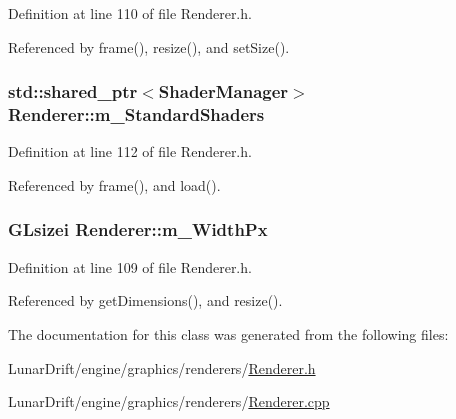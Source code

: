 Definition at line 110 of file Renderer.\+h.



Referenced by frame(), resize(), and set\+Size().

\subsubsection[{\texorpdfstring{m\+\_\+\+Standard\+Shaders}{m_StandardShaders}}]{\setlength{\rightskip}{0pt plus 5cm}std\+::shared\+\_\+ptr$<${\bf Shader\+Manager}$>$ Renderer\+::m\+\_\+\+Standard\+Shaders\hspace{0.3cm}{\ttfamily [private]}}\hypertarget{class_renderer_a45692735f3f2562d55f8d51c4bc5fd1c}{}\label{class_renderer_a45692735f3f2562d55f8d51c4bc5fd1c}


Definition at line 112 of file Renderer.\+h.



Referenced by frame(), and load().

\subsubsection[{\texorpdfstring{m\+\_\+\+Width\+Px}{m_WidthPx}}]{\setlength{\rightskip}{0pt plus 5cm}G\+Lsizei Renderer\+::m\+\_\+\+Width\+Px\hspace{0.3cm}{\ttfamily [private]}}\hypertarget{class_renderer_ad70df586fdb171b32e3c5b4a31a5104b}{}\label{class_renderer_ad70df586fdb171b32e3c5b4a31a5104b}


Definition at line 109 of file Renderer.\+h.



Referenced by get\+Dimensions(), and resize().



The documentation for this class was generated from the following files\+:\begin{DoxyCompactItemize}
\item 
Lunar\+Drift/engine/graphics/renderers/\hyperlink{_renderer_8h}{Renderer.\+h}\item 
Lunar\+Drift/engine/graphics/renderers/\hyperlink{_renderer_8cpp}{Renderer.\+cpp}\end{DoxyCompactItemize}

